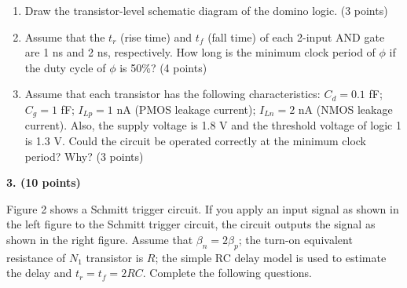 \documentclass[10pt]{article}
\newcommand{\qheading}[1]{\par\medskip\textbf{#1}\par}
\begin{document}
\begin{enumerate}[label=(\alph*),leftmargin=7mm]
\item Draw the transistor-level schematic diagram of the domino logic. (3 points)
\item Assume that the $t_r$ (rise time) and $t_f$ (fall time) of each 2-input AND gate are 1 ns and 2 ns, respectively. How long is the minimum clock period of $\phi$ if the duty cycle of $\phi$ is 50\%? (4 points)
\item Assume that each transistor has the following characteristics: $C_d=0.1$ fF; $C_g=1$ fF; $I_{Lp}=1$ nA (PMOS leakage current); $I_{Ln}=2$ nA (NMOS leakage current). Also, the supply voltage is 1.8 V and the threshold voltage of logic 1 is 1.3 V. Could the circuit be operated correctly at the minimum clock period? Why? (3 points)
\end{enumerate}
\newpage
\qheading{3. (10 points)} Figure 2 shows a Schmitt trigger circuit. If you apply an input signal as shown in the left figure to the Schmitt trigger circuit, the circuit outputs the signal as shown in the right figure. Assume that $\beta_n=2\beta_p$; the turn-on equivalent resistance of $N_1$ transistor is $R$; the simple RC delay model is used to estimate the delay and $t_r=t_f=2RC$. Complete the following questions.
\end{document}
